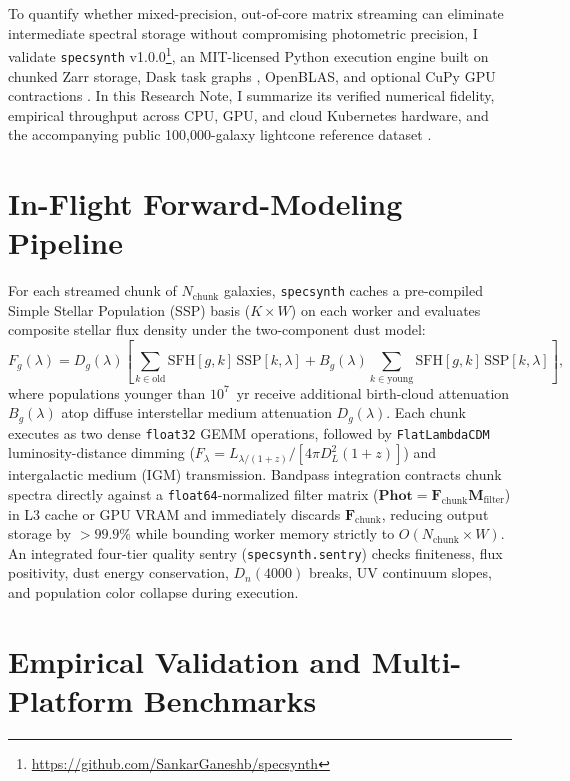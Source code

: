 \documentclass[RNAAS]{aastex7}
\begin{document}
To quantify whether mixed-precision, out-of-core matrix streaming can eliminate intermediate spectral storage without compromising photometric precision, I validate \texttt{specsynth} v1.0.0\footnote{\url{https://github.com/SankarGaneshb/specsynth}}, an MIT-licensed Python execution engine built on chunked Zarr storage, Dask task graphs \citep{rocklin2015dask}, OpenBLAS, and optional CuPy GPU contractions \citep{okuta2017cupy}. In this Research Note, I summarize its verified numerical fidelity, empirical throughput across CPU, GPU, and cloud Kubernetes hardware, and the accompanying public 100,000-galaxy lightcone reference dataset \citep{sankar_ganesh_bala_krishnan_2026}.

\section{In-Flight Forward-Modeling Pipeline}

For each streamed chunk of $N_{\text{chunk}}$ galaxies, \texttt{specsynth} caches a pre-compiled Simple Stellar Population (SSP) basis ($K\times W$) on each worker and evaluates composite stellar flux density under the \citet{charlot2000simple} two-component dust model:
\begin{equation}
F_g(\lambda) = D_g(\lambda)\!\left[\sum_{k\in\text{old}}\mathrm{SFH}[g,k]\,\mathrm{SSP}[k,\lambda] + B_g(\lambda)\sum_{k\in\text{young}}\mathrm{SFH}[g,k]\,\mathrm{SSP}[k,\lambda]\right],
\end{equation}
where populations younger than $10^7$~yr receive additional birth-cloud attenuation $B_g(\lambda)$ atop diffuse interstellar medium attenuation $D_g(\lambda)$. Each chunk executes as two dense \texttt{float32} GEMM operations, followed by \texttt{FlatLambdaCDM} luminosity-distance dimming ($F_\lambda = L_{\lambda/(1+z)}/[4\pi D_L^2(1+z)]$) and \citet{madau1995radiative} intergalactic medium (IGM) transmission. Bandpass integration contracts chunk spectra directly against a \texttt{float64}-normalized filter matrix ($\mathbf{Phot} = \mathbf{F}_{\text{chunk}}\mathbf{M}_{\text{filter}}$) in L3 cache or GPU VRAM and immediately discards $\mathbf{F}_{\text{chunk}}$, reducing output storage by $>99.9\%$ while bounding worker memory strictly to $O(N_{\text{chunk}} \times W)$. An integrated four-tier quality sentry (\texttt{specsynth.sentry}) checks finiteness, flux positivity, dust energy conservation, $D_n(4000)$ breaks, UV continuum slopes, and population color collapse during execution.

\section{Empirical Validation and Multi-Platform Benchmarks}
\end{document}
